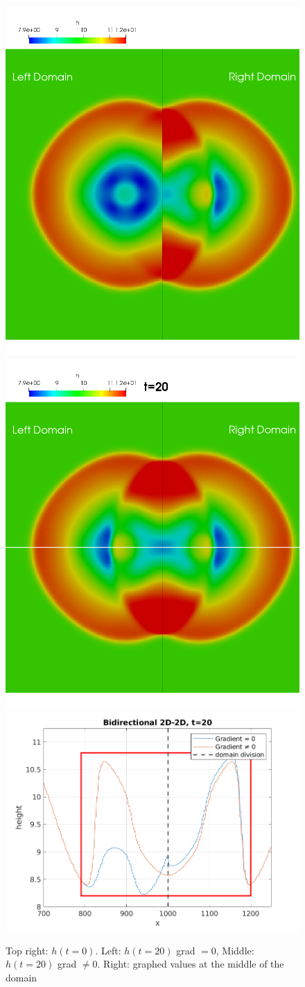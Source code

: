 \begin{frame}
\begin{figure}[htp]
\centering
\includegraphics[width=.25\textwidth]{./Resources/Images/bidirectional20_g_0.png}\hfill
\includegraphics[width=.25\textwidth]{./Resources/Images/bidirectional20_g_bueno.png}\hfill
\includegraphics[width=.4\textwidth]{./Resources/Images/bidirectional_graph.png}
\caption{Top right: $h(t=0)$. Left: $h(t=20)$ grad $=0$, Middle: $h(t=20)$ grad $\neq0$. Right: graphed values at the middle of the domain}
\end{figure}

\end{frame}

%
%
%
%
%



